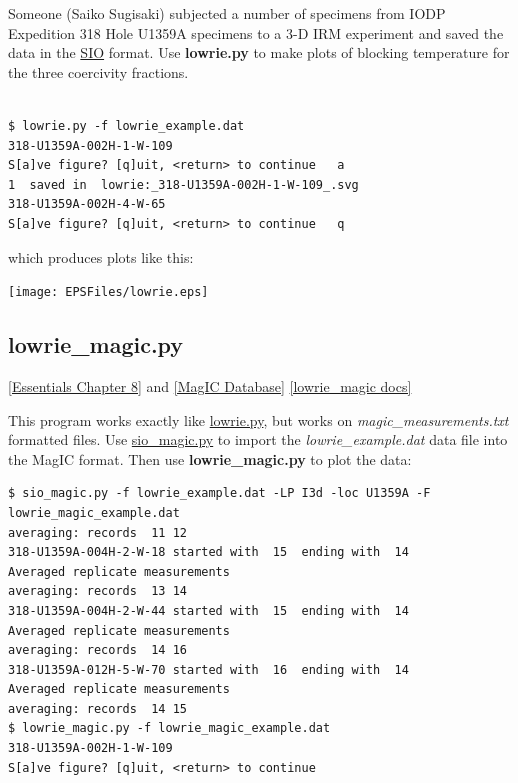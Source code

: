 \documentclass[11pt]{book}
\begin{document}
{{{{Someone (Saiko Sugisaki) subjected a number of specimens from IODP Expedition 318 Hole U1359A specimens to a 3-D IRM experiment and saved the data in the \href{#sio_magic.py}{SIO} format.
Use {\bf lowrie.py} to make plots of blocking temperature for the three  coercivity fractions.

\begin{verbatim}

$ lowrie.py -f lowrie_example.dat
318-U1359A-002H-1-W-109
S[a]ve figure? [q]uit, <return> to continue   a
1  saved in  lowrie:_318-U1359A-002H-1-W-109_.svg
318-U1359A-002H-4-W-65
S[a]ve figure? [q]uit, <return> to continue   q
\end{verbatim}

which produces plots like this:

\texttt{[image: EPSFiles/lowrie.eps]}

\subsection{lowrie\_magic.py}
\href{http://earthref.org/MAGIC/books/Tauxe/Essentials/WebBook3ch8.html#lowrie}{[Essentials Chapter 8]} and \href{#MagICDatabase}{[MagIC Database]}
\href{https://github.com/PmagPy/PmagPy/blob/master/programs/lowrie_magic.py}{[lowrie\_magic docs]}

This program works exactly like \href{#lowrie.py}{lowrie.py}, but works on {\it magic\_measurements.txt} formatted files.  Use \href{#sio_magic.py}{sio\_magic.py} to import the {\it lowrie\_example.dat} data file into the MagIC format.  Then use {\bf lowrie\_magic.py} to plot the data:

\begin{verbatim}
$ sio_magic.py -f lowrie_example.dat -LP I3d -loc U1359A -F lowrie_magic_example.dat
averaging: records  11 12
318-U1359A-004H-2-W-18 started with  15  ending with  14
Averaged replicate measurements
averaging: records  13 14
318-U1359A-004H-2-W-44 started with  15  ending with  14
Averaged replicate measurements
averaging: records  14 16
318-U1359A-012H-5-W-70 started with  16  ending with  14
Averaged replicate measurements
averaging: records  14 15
$ lowrie_magic.py -f lowrie_magic_example.dat
318-U1359A-002H-1-W-109
S[a]ve figure? [q]uit, <return> to continue
\end{verbatim}


}}}}
\end{document}

